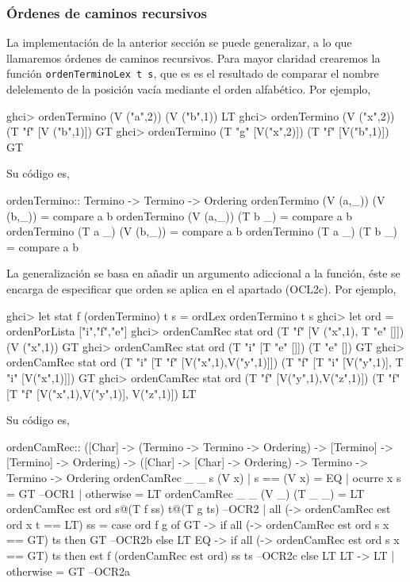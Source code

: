\subsubsection{Órdenes de caminos recursivos}

La implementación de la anterior sección se puede generalizar, a lo
que llamaremos órdenes de caminos recursivos. Para mayor claridad
crearemos la función \texttt{ordenTerminoLex t s}, que es es el
resultado de comparar el nombre delelemento de la posición vacía
mediante el orden alfabético. Por ejemplo,

\begin{sesion}
ghci> ordenTermino (V ("a",2)) (V ("b",1))
LT
ghci> ordenTermino (V ("x",2)) (T "f" [V ("b",1)])
GT
ghci> ordenTermino (T "g" [V("x",2)]) (T "f" [V("b",1)])
GT
\end{sesion}

Su código es,

\begin{codigo}
ordenTermino::  Termino -> Termino -> Ordering
ordenTermino (V (a,_)) (V (b,_)) = compare a b
ordenTermino (V (a,_)) (T b _) = compare a b
ordenTermino (T a _) (V (b,_)) = compare a b
ordenTermino (T a _) (T b _) = compare a b
\end{codigo}

La generalización se basa en añadir un argumento adiccional a la
función, éste se encarga de especificar que orden se aplica en el
apartado (OCL2c). Por ejemplo,

\begin{sesion}
ghci> let stat f (ordenTermino) t s = ordLex ordenTermino t s 
ghci> let ord = ordenPorLista ["i","f","e"]
ghci> ordenCamRec stat ord (T "f" [V ("x",1), T "e" []]) (V ("x",1))
GT
ghci> ordenCamRec stat ord (T "i" [T "e" []]) (T "e" [])
GT
ghci> ordenCamRec stat ord (T "i" [T "f" [V("x",1),V("y",1)]])
                           (T "f" [T "i" [V("y",1)], T "i" [V("x",1)]])
GT
ghci> ordenCamRec stat ord (T "f" [V("y",1),V("z",1)])
                           (T "f" [T "f" [V("x",1),V("y",1)], V("z",1)])
LT
\end{sesion}

Su código es,

\begin{codigo}
ordenCamRec:: ([Char] -> (Termino -> Termino -> Ordering)
                      -> [Termino] -> [Termino] -> Ordering)
           ->  ([Char] -> [Char] -> Ordering)
           -> Termino
           -> Termino
           -> Ordering
ordenCamRec _ _ s (V x)
  | s == (V x) = EQ
  | ocurre x s = GT --OCR1
  | otherwise = LT
ordenCamRec _ _ (V _) (T _ _) = LT
ordenCamRec est ord s@(T f ss) t@(T g ts) --OCR2
  | all (\x -> ordenCamRec est ord x t == LT) ss
    = case ord f g of
      GT -> if all (\x -> ordenCamRec est ord s x == GT) ts
            then GT --OCR2b
            else LT
      EQ -> if all (\x -> ordenCamRec est ord s x == GT) ts
            then est f (ordenCamRec est ord) ss ts --OCR2c
            else LT
      LT -> LT
  | otherwise = GT --OCR2a
\end{codigo}

